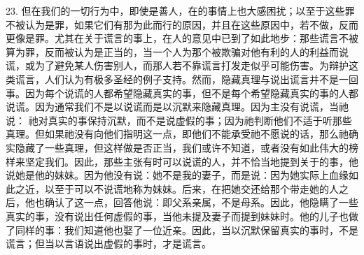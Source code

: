23. 但在我们的一切行为中，即使是善人，在的事情上也大感困扰；以至于这些罪不被认为是罪，如果它们有那为此而行的原因，并且在这些原因中，若不做，反而更像是罪。尤其在关于谎言的事上，在人的意见中已到了如此地步：那些谎言不被算为罪，反而被认为是正当的，当一个人为那个被欺骗对他有利的人的利益而说谎，或为了避免某人伤害别人，而那人若不靠谎言打发走似乎可能伤害。为辩护这类谎言，人们认为有极多圣经的例子支持。然而，隐藏真理与说出谎言并不是一回事。因为每个说谎的人都希望隐藏真实的事，但不是每个希望隐藏真实的事的人都说谎。因为通常我们不是以说谎而是以沉默来隐藏真理。因为主没有说谎，当祂说： 祂对真实的事保持沉默，而不是说虚假的事；因为祂判断他们不适于听那些真理。但如果祂没有向他们指明这一点，即他们不能承受祂不愿说的话，那么祂确实隐藏了一些真理，但这样做是否正当，我们或许不知道，或者没有如此伟大的榜样来坚定我们。因此，那些主张有时可以说谎的人，并不恰当地提到关于的事，他说她是他的妹妹。因为他没有说：她不是我的妻子，而是说：因为她实际上血缘如此之近，以至于可以不说谎地称为妹妹。后来，在把她交还给那个带走她的人之后，他也确认了这一点，回答他说：即父系亲属，不是母系。因此，他隐瞒了一些真实的事，没有说出任何虚假的事，当他未提及妻子而提到妹妹时。他的儿子也做了同样的事：我们知道他也娶了一位近亲。因此，当以沉默保留真实的事时，不是谎言；但当以言语说出虚假的事时，才是谎言。\par


